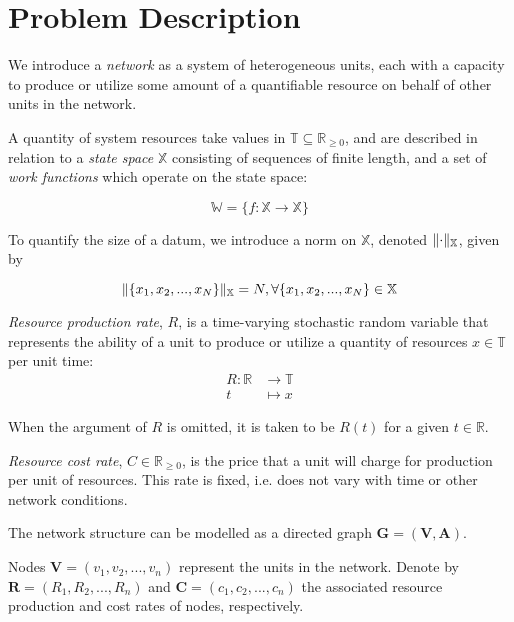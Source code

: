 \documentclass[../mthe-493-project-proposal.tex]{subfiles}
\begin{document}
    \chapter{Problem Description}
    \label{ch:problem-description}
    We introduce a \textit{network} as a system of heterogeneous units, each with a capacity to produce or utilize some amount of a quantifiable resource on behalf of other units in the network.

    A quantity of system resources take values in $\mathbb{T} \subseteq \mathbb{R}_{\geq 0}$, and are described in relation to a \textit{state space} $\mathbb{X}$ consisting of sequences of finite length, and a set of \textit{work functions} which operate on the state space:

    \begin{equation*}
        \mathbb{W} = \{f: \mathbb{X} \rightarrow \mathbb{X}\}
    \end{equation*}

    To quantify the size of a datum, we introduce a norm on $\mathbb{X}$, denoted $\lVert\cdot\rVert_{\mathbb{X}}$, given by

    \begin{equation*}
        \lVert\{x_1, x_2, ..., x_N\}\rVert_{\mathbb{X}} = N, \forall \{x_1, x_2, ..., x_N\} \in \mathbb{X}
    \end{equation*}

    \textit{Resource production rate}, $R$, is a time-varying stochastic random variable that represents the ability of a unit to produce or utilize a quantity of resources $x \in \mathbb{T}$ per unit time:
    \begin{align*}
        R \colon \mathbb{R} &\to \mathbb{T} \\
        t                   &\mapsto x
    \end{align*}

    When the argument of $R$ is omitted, it is taken to be $R(t)$ for a given $t \in \mathbb{R}$.

    \textit{Resource cost rate}, $C \in \mathbb{R}_{\geq 0}$, is the price that a unit will charge for production per unit of resources. This rate is fixed, i.e. does not vary with time or other network conditions.

    The network structure can be modelled as a directed graph $\mathbf{G} = (\mathbf{V}, \mathbf{A})$.

    Nodes $\mathbf{V} = (v_1, v_2, ..., v_n)$ represent the units in the network. Denote by $\mathbf{R} = (R_1, R_2, ..., R_n)$ and $\mathbf{C} = (c_1, c_2, ..., c_n)$ the associated resource production and cost rates of nodes, respectively.
\end{document}
